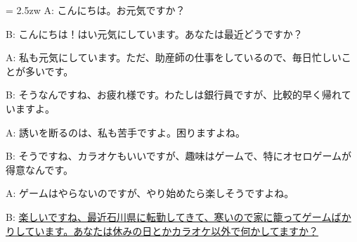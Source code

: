 \documentclass[11pt]{amsart}
\title{}
\author{}
\newenvironment{hangall}[1]{\hangindent = 2.5zw\everypar{\hangindent = 2.5zw}}{}
\begin{document}
\maketitle
\begin{hangall}{}%
A: こんにちは。お元気ですか？

B: こんにちは！はい元気にしています。あなたは最近どうですか？

A: 私も元気にしています。ただ、助産師の仕事をしているので、毎日忙しいことが多いです。

B: そうなんですね、お疲れ様です。わたしは銀行員ですが、比較的早く帰れていますよ。

A: 誘いを断るのは、私も苦手ですよ。困りますよね。

B: そうですね、カラオケもいいですが、趣味はゲームで、特にオセロゲームが得意なんです。

A: ゲームはやらないのですが、やり始めたら楽しそうですよね。

B: \ul{楽しいですね、最近石川県に転勤してきて、寒いので家に籠ってゲームばかりしています。あなたは休みの日とかカラオケ以外で何かしてますか？}\end{hangall}
\end{document}
